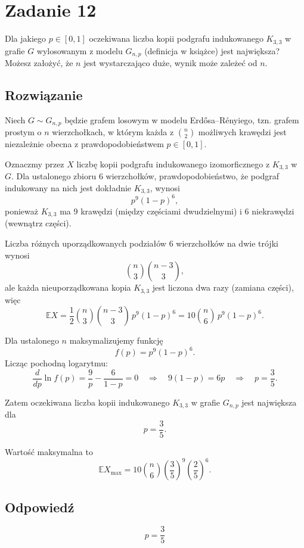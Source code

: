 \section{Zadanie 12}
Dla jakiego \(p \in [0,1]\) oczekiwana liczba kopii podgrafu indukowanego \(K_{3,3}\)
w grafie \(G\) wylosowanym z modelu \(G_{n,p}\) (definicja w książce) jest największa?
Możesz założyć, że \(n\) jest wystarczająco duże, wynik może zależeć od \(n\).

\subsection*{Rozwiązanie}
Niech \(G \sim G_{n,p}\) będzie grafem losowym w modelu Erdősa–Rényiego, tzn. grafem prostym o \(n\) wierzchołkach, w którym każda z \(\binom{n}{2}\) możliwych krawędzi jest niezależnie obecna z prawdopodobieństwem \(p \in [0,1]\).

Oznaczmy przez \(X\) liczbę kopii podgrafu indukowanego izomorficznego z \(K_{3,3}\) w \(G\). Dla ustalonego zbioru 6 wierzchołków, prawdopodobieństwo, że podgraf indukowany na nich jest dokładnie \(K_{3,3}\), wynosi
\[
	p^9 (1-p)^6,
\]
ponieważ \(K_{3,3}\) ma 9 krawędzi (między częściami dwudzielnymi) i 6 niekrawędzi (wewnątrz części).

Liczba różnych uporządkowanych podziałów 6 wierzchołków na dwie trójki wynosi
\[
	\binom{n}{3}\binom{n-3}{3},
\]
ale każda nieuporządkowana kopia \(K_{3,3}\) jest liczona dwa razy (zamiana części), więc
\[
	\mathbb{E}X = \frac{1}{2} \binom{n}{3}\binom{n-3}{3} \, p^9 (1-p)^6
	= 10 \binom{n}{6} \, p^9 (1-p)^6.
\]

Dla ustalonego \(n\) maksymalizujemy funkcję
\[
	f(p) = p^9 (1-p)^6.
\]
Licząc pochodną logarytmu:
\[
	\frac{d}{dp} \ln f(p) = \frac{9}{p} - \frac{6}{1-p} = 0
	\quad \Longrightarrow \quad 9(1-p) = 6p \quad \Longrightarrow \quad p = \frac{3}{5}.
\]

Zatem oczekiwana liczba kopii indukowanego \(K_{3,3}\) w grafie \(G_{n,p}\) jest największa dla
\[
	p = \frac{3}{5}.
\]

Wartość maksymalna to
\[
	\mathbb{E}X_{\max} = 10 \binom{n}{6} \left(\frac{3}{5}\right)^9 \left(\frac{2}{5}\right)^6.
\]


\subsection*{Odpowiedź}
\[
	\boxed{p = \frac{3}{5}}
\]

